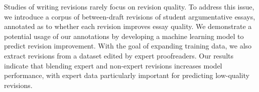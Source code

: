 Studies of writing revisions rarely focus on revision quality. To address this issue, we introduce a corpus of between-draft revisions of student argumentative essays, annotated as to whether each revision improves essay quality. We demonstrate a potential usage of our annotations by developing a machine learning model to predict revision improvement. With the goal of expanding training data, we also extract revisions from a dataset edited by expert proofreaders. Our results indicate that blending expert and non-expert revisions increases model performance, with expert data particularly important for predicting low-quality revisions.
